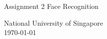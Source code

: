 \begin{titlepage}
    \begin{center}
        \vspace*{1cm}
        
        \Huge
          \textbf{\courseName}
        
        \vspace{0.5cm}
        \LARGE
        Assignment 2 Face Recognition
        
        \vspace{1.5cm}
        
        \textbf{\authorFullName}
   		  \vspace{1.5cm}
        
        \textbf{\authorUCO}
       
        \vfill
        
        \authorFieldOfStudy
        
        \vspace{0.8cm}
          \Large
        National University of Singapore\\
        \vspace{0.5cm}
       \today
        
    \end{center}
\end{titlepage}